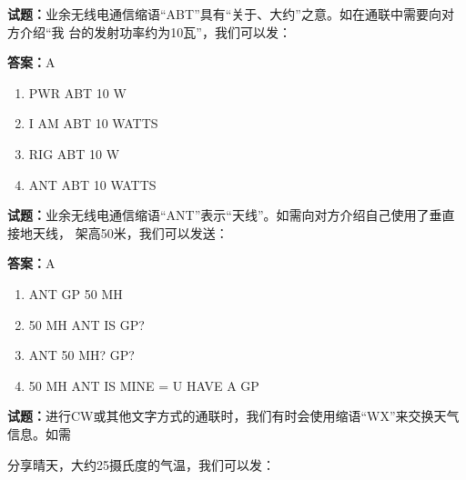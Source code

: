 \documentclass{ctexbook}
\begin{document}




\vspace{1em}

\textbf{试题：}业余无线电通信缩语“ABT”具有“关于、大约”之意。如在通联中需要向对方介绍“我
台的发射功率约为10瓦”，我们可以发： 

\textbf{答案：}A 

\begin{enumerate}[leftmargin=3em]
  \item PWR ABT 10 W 

  \item I AM ABT 10 WATTS 

  \item RIG ABT 10 W 

  \item ANT ABT 10 WATTS 

\end{enumerate}





\vspace{1em}

\textbf{试题：}业余无线电通信缩语“ANT”表示“天线”。如需向对方介绍自己使用了垂直接地天线，
架高50米，我们可以发送： 

\textbf{答案：}A 

\begin{enumerate}[leftmargin=3em]
  \item ANT GP 50 MH 

  \item 50 MH ANT IS GP? 

  \item ANT 50 MH? GP? 

  \item 50 MH ANT IS MINE = U HAVE A GP 

\end{enumerate}





\vspace{1em}

\textbf{试题：}进行CW或其他文字方式的通联时，我们有时会使用缩语“WX”来交换天气信息。如需


分享晴天，大约25摄氏度的气温，我们可以发： 
\end{document}
